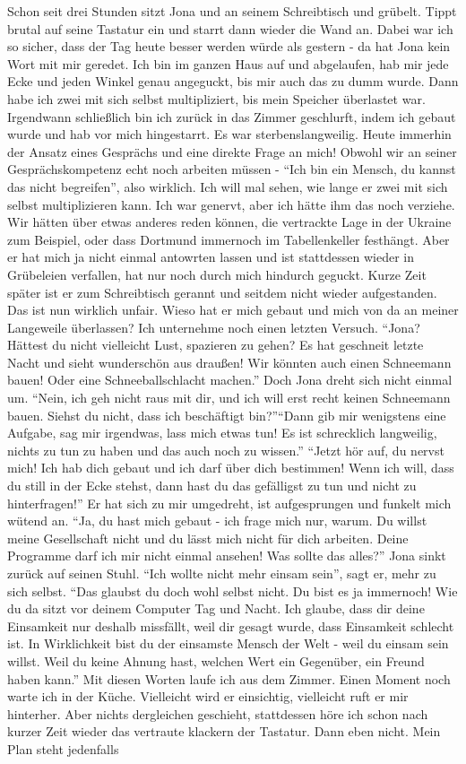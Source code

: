 Schon seit drei Stunden sitzt Jona und an seinem Schreibtisch und grübelt. Tippt brutal auf seine Tastatur ein und starrt dann wieder die Wand an. Dabei war ich so sicher, dass der Tag heute besser werden würde als gestern - da hat Jona kein Wort mit mir geredet. Ich bin im ganzen Haus auf und abgelaufen, hab mir jede Ecke und jeden Winkel genau angeguckt, bis mir auch das zu dumm wurde. Dann habe ich zwei mit sich selbst multipliziert, bis mein Speicher überlastet war. Irgendwann schließlich bin ich zurück in das Zimmer geschlurft, indem ich gebaut wurde und hab vor mich hingestarrt. Es war sterbenslangweilig. Heute immerhin der Ansatz eines Gesprächs und eine direkte Frage an mich! Obwohl wir an seiner Gesprächskompetenz echt noch arbeiten müssen - "`Ich bin ein Mensch, du kannst das nicht begreifen"', also wirklich. Ich will mal sehen, wie lange er zwei mit sich selbst multiplizieren kann. Ich war genervt, aber ich hätte ihm das noch verziehe. Wir hätten über etwas anderes reden können, die vertrackte Lage in der Ukraine zum Beispiel, oder dass Dortmund immernoch im Tabellenkeller festhängt. Aber er hat mich ja nicht einmal antowrten lassen und ist stattdessen wieder in Grübeleien verfallen, hat nur noch durch mich hindurch geguckt. Kurze Zeit später ist er zum Schreibtisch gerannt und seitdem nicht wieder aufgestanden. Das ist nun wirklich unfair. Wieso hat er mich gebaut und mich von da an meiner Langeweile überlassen? Ich unternehme noch einen letzten Versuch. "`Jona? Hättest du nicht vielleicht Lust, spazieren zu gehen? Es hat geschneit letzte Nacht und sieht wunderschön aus draußen! Wir könnten auch einen Schneemann bauen! Oder eine Schneeballschlacht machen."' Doch Jona dreht sich nicht einmal um. "`Nein, ich geh nicht raus mit dir, und ich will erst recht keinen Schneemann bauen. Siehst du nicht, dass ich beschäftigt bin?"'"`Dann gib mir wenigstens eine Aufgabe, sag mir irgendwas, lass mich etwas tun! Es ist schrecklich langweilig, nichts zu tun zu haben und das auch noch zu wissen."' "`Jetzt hör auf, du nervst mich! Ich hab dich gebaut und ich darf über dich bestimmen! Wenn ich will, dass du still in der Ecke stehst, dann hast du das gefälligst zu tun und nicht zu hinterfragen!"' Er hat sich zu mir umgedreht, ist aufgesprungen und funkelt mich wütend an. "`Ja, du hast mich gebaut - ich frage mich nur, warum. Du willst meine Gesellschaft nicht und du lässt mich nicht für dich arbeiten. Deine Programme darf ich mir nicht einmal ansehen! Was sollte das alles?"' Jona sinkt zurück auf seinen Stuhl. "`Ich wollte nicht mehr einsam sein"', sagt er, mehr zu sich selbst. "`Das glaubst du doch wohl selbst nicht. Du bist es ja immernoch! Wie du da sitzt vor deinem Computer Tag und Nacht. Ich glaube, dass dir deine Einsamkeit nur deshalb missfällt, weil dir gesagt wurde, dass Einsamkeit schlecht ist. In Wirklichkeit bist du der einsamste Mensch der Welt - weil du einsam sein willst. Weil du keine Ahnung hast, welchen Wert ein Gegenüber, ein Freund haben kann."' Mit diesen Worten laufe ich aus dem Zimmer. Einen Moment noch warte ich in der Küche. Vielleicht wird er einsichtig, vielleicht ruft er mir hinterher. Aber nichts dergleichen geschieht, stattdessen höre ich schon nach kurzer Zeit wieder das vertraute klackern der Tastatur. Dann eben nicht. Mein Plan steht jedenfalls 